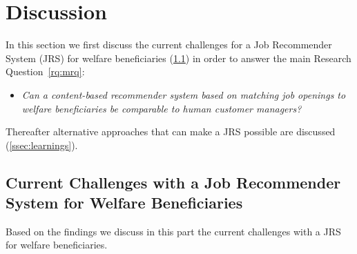 \section{Discussion}
\label{sec:disc}
In this section we first discuss the current challenges for a Job Recommender System (JRS) for 
welfare beneficiaries (\ref{ssec:jrswb}) in order to answer the main Research Question~\ref{rq:mrq}: 
\begin{itemize}
	\item[] \em Can a content-based recommender system based on matching job openings to welfare beneficiaries be comparable to human customer managers?
\end{itemize}
Thereafter alternative approaches that can make a JRS possible are discussed (\ref{ssec:learnings}). 

\subsection{Current Challenges with a Job Recommender System for Welfare Beneficiaries}
\label{ssec:jrswb}
Based on the findings we discuss in this part the current challenges with a JRS for welfare beneficiaries.

